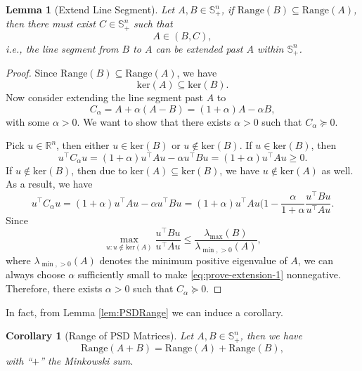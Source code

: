 \documentclass[
]{book}
\newtheorem{lemma}{Lemma}[chapter]
\newtheorem{corollary}{Corollary}[chapter]
\theoremstyle{definition}
\theoremstyle{definition}
\theoremstyle{definition}
\theoremstyle{definition}
\theoremstyle{remark}
\begin{document}
\begin{lemma}[Extend Line Segment]
\protect\hypertarget{lem:Extension}{}\label{lem:Extension}Let \(A,B \in \mathbb{S}^{n}_{+}\), if \(\mathrm{Range}(B) \subseteq \mathrm{Range}(A)\), then there must exist \(C \in \mathbb{S}^{n}_{+}\) such that
\[
A \in (B,C),
\]
i.e., the line segment from \(B\) to \(A\) can be extended past \(A\) within \(\mathbb{S}^{n}_{+}\).
\end{lemma}

\begin{proof}
Since \(\mathrm{Range}(B) \subseteq \mathrm{Range}(A)\), we have
\[
\mathrm{ker}(A) \subseteq \mathrm{ker}(B).
\]
Now consider extending the line segment past \(A\) to
\[
C_{\alpha} = A + \alpha(A - B) = (1+\alpha) A - \alpha B,
\]
with some \(\alpha > 0\). We want to show that there exists \(\alpha > 0\) such that \(C_{\alpha} \succeq 0\).

Pick \(u \in \mathbb{R}^{n}\), then either \(u \in \mathrm{ker}(B)\) or \(u \not\in \mathrm{ker}(B)\). If \(u \in \mathrm{ker}(B)\), then
\[
u^\top C_{\alpha} u = (1+\alpha) u^\top A u - \alpha u^\top B u = (1+\alpha) u^\top A u \geq 0.
\]
If \(u \not\in \mathrm{ker}(B)\), then due to \(\mathrm{ker}(A) \subseteq \mathrm{ker}(B)\), we have \(u \not\in \mathrm{ker}(A)\) as well. As a result, we have
\begin{equation}
u^\top C_{\alpha} u = (1+\alpha) u^\top A u - \alpha u^\top B u = (1+\alpha) u^\top A u \lparen{ 1- \frac{\alpha}{1+\alpha} \frac{u^\top B u}{u^\top A u} }.
\label{eq:prove-extension-1}
\end{equation}
Since
\[
\max_{u: u \not\in \mathrm{ker}(A)} \frac{u^\top B u}{u^\top A u} \leq \frac{\lambda_{\max}(B)}{\lambda_{\min,>0}(A)},
\]
where \(\lambda_{\min,>0}(A)\) denotes the minimum positive eigenvalue of \(A\), we can always choose \(\alpha\) sufficiently small to make \eqref{eq:prove-extension-1} nonnegative. Therefore, there exists \(\alpha > 0\) such that \(C_{\alpha} \succeq 0\).
\end{proof}

In fact, from Lemma \ref{lem:PSDRange} we can induce a corollary.

\begin{corollary}[Range of PSD Matrices]
\protect\hypertarget{cor:PSDRange}{}\label{cor:PSDRange}Let \(A, B \in \mathbb{S}^{n}_{+}\), then we have
\[
\mathrm{Range}(A + B) = \mathrm{Range}(A) + \mathrm{Range}(B),
\]
with ``\(+\)'' the Minkowski sum.
\end{corollary}
\end{document}
